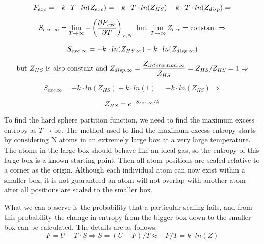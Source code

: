\begin{equation}\label{eq:MCHS2}
\newline F_{exc}=-k\cdot T\cdot ln(Z_{exc})=-k\cdot T\cdot ln(Z_{HS})-k\cdot T\cdot ln(Z_{disp})\Rightarrow 
\end{equation}

\begin{equation}\label{eq:MCHS3}
\newline S_{exc.\infty}=\lim_{T\to\infty}-\left ( \frac{\partial F_{exc}}{\partial T} \right ) _{V,N} \text{ but }\lim_{T\to\infty}Z_{exc}=\text{constant}\Rightarrow
\end{equation}

\begin{equation}\label{eq:MCHS4}
\newline S_{exc.\infty}=-k\cdot ln(Z_{HS.\infty})-k\cdot ln(Z_{disp.\infty})
\end{equation}

\begin{equation}\label{eq:MCHS5}
\newline \text{but }Z_{HS}\text{ is also constant and }Z_{disp.\infty}=\frac{Z_{interaction.\infty}}{Z_{HS}}=Z_{HS}/Z_{HS}=1 \Rightarrow
\end{equation}

\begin{equation}\label{eq:MCHS6}
S_{exc.\infty}=-k\cdot ln(Z_{HS})-k\cdot ln(1)=-k\cdot ln(Z_{HS}) \Rightarrow
\end{equation}

\begin{equation}\label{eq:MCHS7}
\newline Z_{HS}=e^{-S_{exc.\infty}/k}
\end{equation}

To find the hard sphere partition function, we need to find the maximum excess entropy as $T\to\infty$. The method used to find the maximum excess entropy starts by considering N atoms in an extremely large box at a very large temperature. The atoms in the large box should behave like an ideal gas, so the entropy of this large box is a known starting point. Then all atom positions are scaled relative to a corner as the origin. Although each individual atom can now exist within a smaller box, it is not guaranteed an atom will not overlap with another atom after all positions are scaled to the smaller box.

What we can observe is the probability that a particular scaling fails, and from this probability the change in entropy from the bigger box down to the smaller box can be calculated. The details are as follows:
\begin{equation}\label{eq:MCHS8}
F=U-T\cdot S \Rightarrow  S=(U-F)/T\approx -F/T=k\cdot ln(Z)
\end{equation}

